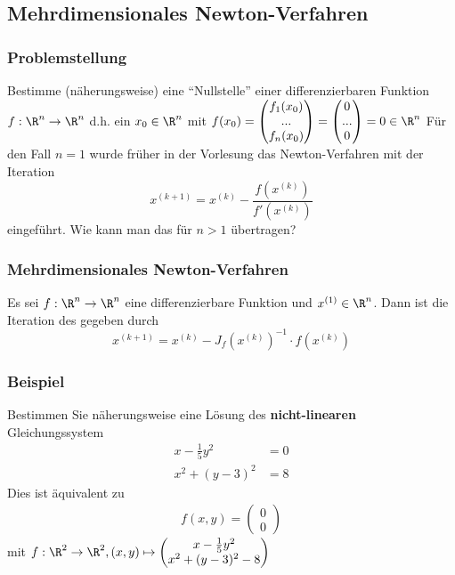 \subsection{Mehrdimensionales Newton-Verfahren}
%
\begin{frame}\frametitle{Problemstellung}
Bestimme (näherungsweise) eine ``Nullstelle'' einer differenzierbaren Funktion
$
f: \R^n \to \R^n
$
d.h. ein $x_0 \in \R^n$ mit $f(x_0)=\begin{pmatrix}f_1(x_0)\\...\\f_n(x_0) \end{pmatrix}=\begin{pmatrix} 0 \\ ... \\ 0 \end{pmatrix}=0 \in \R^n$
\pause
\vfill
Für den Fall $n=1$ wurde früher in der Vorlesung das Newton-Verfahren mit der Iteration 
$$
x^{(k+1)}=x^{(k)} - \frac{f(x^{(k)})}{f'(x^{(k)})}
$$
eingeführt.
\pause
\vfill
Wie kann man das für $n>1$ übertragen?
\end{frame}
%
%
\begin{frame}\frametitle{Mehrdimensionales Newton-Verfahren}
Es sei $f: \R^n \to \R^n$ eine differenzierbare Funktion und $x^{(1)} \in \R^n$. Dann ist die Iteration des  gegeben durch
$$
x^{(k+1)}=x^{(k)} - J_f(x^{(k)})^{-1}\cdot f(x^{(k)})
$$


\end{frame}
%
%
\begin{frame}\frametitle{Beispiel}
Bestimmen Sie näherungsweise eine Lösung des \textbf{nicht-linearen} Gleichungssystem
\begin{align*}
x-\frac{1}{5}y^2 &=0\\
x^2+(y-3)^2&=8
\end{align*}
\pause Dies ist äquivalent zu
\begin{align*}
f(x,y)=\begin{pmatrix} 0\\0\end{pmatrix}
\end{align*}
mit $f: \R^2 \to \R^2, (x,y) \mapsto \begin{pmatrix} x-\frac{1}{5}y^2 \\ x^2+(y-3)^2-8\end{pmatrix}$	
\end{frame}
%
